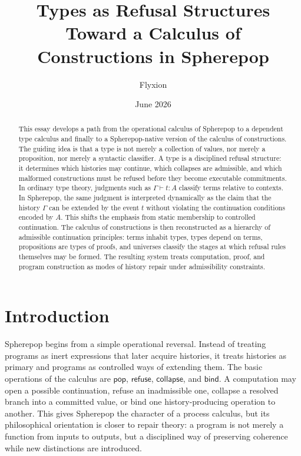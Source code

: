 \documentclass[12pt,oneside]{article}
\title{\textbf{Types as Refusal Structures}\\
\large Toward a Calculus of Constructions in Spherepop}
\author{Flyxion}
\date{June 2026}
\newcommand{\Pop}{\mathsf{pop}}
\newcommand{\Refuse}{\mathsf{refuse}}
\newcommand{\Collapse}{\mathsf{collapse}}
\newcommand{\Bind}{\mathsf{bind}}
\newcommand{\judges}{\vdash}
\begin{document}
\maketitle

\begin{abstract}
This essay develops a path from the operational calculus of Spherepop to a dependent type calculus and finally to a Spherepop-native version of the calculus of constructions. The guiding idea is that a type is not merely a collection of values, nor merely a proposition, nor merely a syntactic classifier. A type is a disciplined refusal structure: it determines which histories may continue, which collapses are admissible, and which malformed constructions must be refused before they become executable commitments. In ordinary type theory, judgments such as $\Gamma \judges t : A$ classify terms relative to contexts. In Spherepop, the same judgment is interpreted dynamically as the claim that the history $\Gamma$ can be extended by the event $t$ without violating the continuation conditions encoded by $A$. This shifts the emphasis from static membership to controlled continuation. The calculus of constructions is then reconstructed as a hierarchy of admissible continuation principles: terms inhabit types, types depend on terms, propositions are types of proofs, and universes classify the stages at which refusal rules themselves may be formed. The resulting system treats computation, proof, and program construction as modes of history repair under admissibility constraints.
\end{abstract}

\section{Introduction}

Spherepop begins from a simple operational reversal. Instead of treating programs as inert expressions that later acquire histories, it treats histories as primary and programs as controlled ways of extending them. The basic operations of the calculus are $\Pop$, $\Refuse$, $\Collapse$, and $\Bind$. A computation may open a possible continuation, refuse an inadmissible one, collapse a resolved branch into a committed value, or bind one history-producing operation to another. This gives Spherepop the character of a process calculus, but its philosophical orientation is closer to repair theory: a program is not merely a function from inputs to outputs, but a disciplined way of preserving coherence while new distinctions are introduced.
\end{document}
